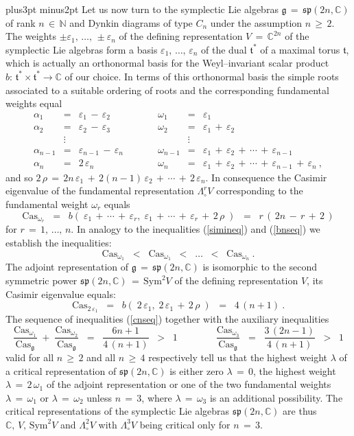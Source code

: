 \documentclass[12pt]{article}
\def\C{\mathbb{C}}
\def\Cas{\mathrm{Cas}}
\def\e{\varepsilon}
\def\g{\mathfrak{g}}
\def\L{\Lambda}
\def\N{\mathbb{N}}
\def\pfill{\vskip6pt plus3pt minus2pt\noindent}
\def\S{\mathrm{Sym}}
\def\sp{\mathfrak{sp}}
\def\t{\mathfrak{t}}
\begin{document}
 \pfill
 Let us now turn to the symplectic Lie algebras $\g\,=\,\sp(2n,\C)$ of
 rank $n\,\in\,\N$ and Dynkin diagrams of type $C_n$ under the assumption
 $n\,\geq\,2$. The weights $\pm\e_1,\,\ldots,\,\pm\e_n$ of the defining
 representation $V\,=\,\C^{2n}$ of the symplectic Lie algebras form a basis
 $\e_1,\,\ldots,\,\e_n$ of the dual $\t^*$ of a maximal torus $\t$, which
 is actually an orthonormal basis for the Weyl--invariant scalar product
 $b:\,\t^*\times\t^*\longrightarrow\C$ of our choice. In terms of this
 orthonormal basis the simple roots associated to a suitable ordering of
 roots and the corresponding fundamental weights equal
 $$
  \begin{array}{lclclcl}
   \alpha_1&=&\e_1\,-\,\e_2&\qquad&
   \omega_1&=&\e_1
   \\
   \alpha_2&=&\e_2\,-\,\e_3&&
   \omega_2&=&\e_1\,+\,\e_2
   \\
   &\vdots&&&&\vdots&
   \\
   \alpha_{n-1}&=&\e_{n-1}\,-\,\e_n&&
   \omega_{n-1}&=&\e_1\,+\,\e_2\,+\,\cdots\,+\,\e_{n-1}
   \\
   \alpha_n&=&2\,\e_n&&
   \omega_n&=&\e_1\,+\,\e_2\,+\,\cdots\,+\,\e_{n-1}\,+\,\e_n\ ,
  \end{array}
 $$
 and so $2\,\rho\,=\,2n\,\e_1\,+\,2(n-1)\,\e_2\,+\,\cdots\,+\,2\,\e_n$.
 In consequence the Casimir eigenvalue of the fundamental representation
 $\L^r_\circ V$ corresponding to the fundamental weight $\omega_r$ equals
 $$
  \Cas_{\omega_r}
  \;\;=\;\;
  b(\;\e_1\,+\,\cdots\,+\,\e_r,\;\e_1\,+\,\cdots\,+\,\e_r\,+\,2\,\rho\;)
  \;\;=\;\;
  r\,(\,2n\,-\,r\,+\,2\,)
 $$
 for $r\,=\,1,\,\ldots,\,n$. In analogy to the inequalities (\ref{simineq})
 and (\ref{bnseq}) we establish the inequalities:
 \begin{equation}\label{cnseq}
  \Cas_{\omega_1}
  \;\;<\;\;
  \Cas_{\omega_1}
  \;\;<\;\;
  \ldots
  \;\;<\;\;
  \Cas_{\omega_n}\ .
 \end{equation}
 The adjoint representation of $\g\,=\,\sp(2n,\C)$ is isomorphic to the
 second symmetric power $\sp(2n,\C)\,=\,\S^2V$ of the defining representation
 $V$, its Casimir eigenvalue equals:
 $$
  \Cas_{2\,\e_1}
  \;\;=\;\;
  b(\;2\,\e_1,\;2\,\e_1\,+\,2\,\rho\;)
  \;\;=\;\;
  4\,(n+1)\ .
 $$
 The sequence of inequalities (\ref{cnseq}) together with the auxiliary
 inequalities
 $$
  \frac{\Cas_{\omega_1}}{\Cas_\g}\;+\;\frac{\Cas_{\omega_2}}{\Cas_\g}
  \;\;=\;\;
  \frac{6n+1}{4\,(n+1)}
  \;\;>\;\;
  1
  \qquad\qquad
  \frac{\Cas_{\omega_3}}{\Cas_\g}
  \;\;=\;\;
  \frac{3\,(2n-1)}{4\,(n+1)}
  \;\;>\;\;
  1
 $$
 valid for all $n\,\geq\,2$ and all $n\,\geq\,4$ respectively tell us
 that the highest weight $\lambda$ of a critical representation of
 $\sp(2n,\C)$ is either zero $\lambda\,=\,0$, the highest weight
 $\lambda\,=\,2\,\omega_1$ of the adjoint representation or one of the
 two fundamental weights $\lambda\,=\,\omega_1$ or $\lambda\,=\,\omega_2$
 unless $n\,=\,3$, where $\lambda\,=\,\omega_3$ is an additional possibility.
 The critical representations of the symplectic Lie algebras $\sp(2n,\C)$ are
 thus $\C,\,V,\,\S^2V$ and $\L^2_\circ V$ with $\L^3_\circ V$ being critical
 only for $n\,=\,3$.
\end{document}
